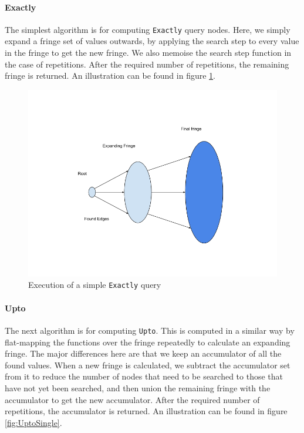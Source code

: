 \documentclass[12pt,a4paper,twoside,openright]{report}
\newcommand\codeName[1]{\texttt{#1}}
\let\oldparagraph\paragraph
\renewcommand{\paragraph}[1]{\oldparagraph{#1}\mbox{}}
\begin{document}
		\paragraph{Exactly}
The simplest algorithm is for computing \codeName{Exactly} query nodes. Here, we simply expand a fringe set of values outwards, by applying the search step to every value in the fringe to get the new fringe. We also memoise the search step function in the case of repetitions. After the required number of repetitions, the remaining fringe is returned. An illustration can be found in figure \ref{fig:ExactlySingle}.

\begin{figure}[ht]
\centering
  \includegraphics[width=\textwidth]{figs/Exactly.png}
  \caption{Execution of a simple \codeName{Exactly} query}
  \label{fig:ExactlySingle}
\end{figure}
    		\paragraph{Upto}
The next algorithm is for computing \codeName{Upto}. This is computed in a similar way by flat-mapping the functions over the fringe repeatedly to calculate an expanding fringe. The major differences here are that we keep an accumulator of all the found values. When a new fringe is calculated, we subtract the accumulator set from it to reduce the number of nodes that need to be searched to those that have not yet been searched, and then union the remaining fringe with the accumulator to get the new accumulator. After the required number of repetitions, the accumulator is returned. An illustration can be found in figure \ref{fig:UptoSingle}.
\end{document}
